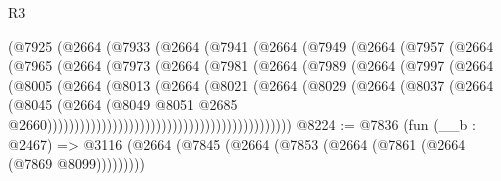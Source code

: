 \begin{lexlean}{R3}
\begin{coremodule}
                            (@7925
                              (@2664
                                (@7933
                                  (@2664
                                    (@7941
                                      (@2664
                                        (@7949
                                          (@2664
                                            (@7957
                                              (@2664
                                                (@7965
                                                  (@2664
                                                    (@7973
                                                      (@2664
                                                        (@7981
                                                          (@2664
                                                            (@7989
                                                              (@2664
                                                                (@7997
                                                                  (@2664
                                                                    (@8005
                                                                      (@2664
                                                                        (@8013
                                                                          (@2664
                                                                            (@8021
                                                                              (@2664
                                                                                (@8029
                                                                                  (@2664
                                                                                    (@8037
                                                                                      (@2664
                                                                                        (@8045
                                                                                          (@2664
                                                                                            (@8049
                                                                                              @8051
                                                                                              @2685
                                                                                              @2660)))))))))))))))))))))))))))))))))))))))))))))
@8224 := @7836
    (fun (__b : @2467) =>
    @3116 (@2664 (@7845 (@2664 (@7853 (@2664 (@7861 (@2664 (@7869 @8099)))))))))

\end{coremodule}
\end{lexlean}
